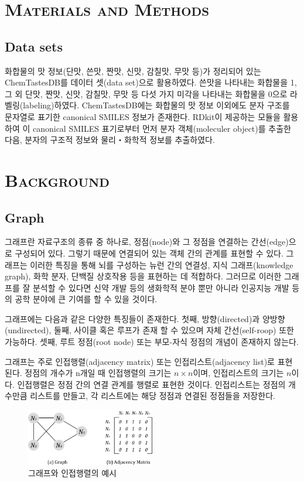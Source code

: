 \documentclass[9pt]{ieeeconf}
\begin{document}
\section[short]{\Large {\textsc{Materials and Methods}}}
\subsection[short]{\large {Data sets}}
화합물의 맛 정보(단맛, 쓴맛, 짠맛, 신맛, 감칠맛, 무맛 등)가 정리되어 있는 ChemTastesDB\cite{rojas2022chemtastesdb}를 데이터 셋(data set)으로 활용하였다. 쓴맛을 나타내는 화합물을 1, 그 외 단맛, 짠맛, 신맛, 감칠맛, 무맛 등 다섯 가지 미각을 나타내는 화합물을 0으로 라벨링(labeling)하였다.
ChemTastesDB에는 화합물의 맛 정보 이외에도 분자 구조를 문자열로 표기한 canonical SMILES 정보가 존재한다. RDkit이 제공하는 모듈을 활용하여 이 canonical SMILES 표기로부터 먼저 분자 객체(moleculer object)를 추출한 다음, 분자의 구조적 정보와 물리‧화학적 정보를 추출하였다.

\section[short]{\Large {\textsc{Background}}}
\subsection[short]{\large {Graph}}
\indent 그래프란 자료구조의 종류 중 하나로, 정점(node)와 그 정점을 연결하는 간선(edge)으로 구성되어 있다.
그렇기 때문에 연결되어 있는 객체 간의 관계를 표현할 수 있다. 그래프는 이러한 특징을 통해 뇌를 구성하는 뉴런 간의 연결성, 지식 그래프(knowledge graph), 화학 분자, 단백질 상호작용 등을 표현하는 데 적합하다.
그러므로 이러한 그래프를 잘 분석할 수 있다면 신약 개발 등의 생화학적 분야 뿐만 아니라 인공지능 개발 등의 공학 분야에 큰 기여를 할 수 있을 것이다.

\indent 그래프에는 다음과 같은 다양한 특징들이 존재한다. 첫째, 방향(directed)과 양방향(undirected), 둘째, 사이클 혹은 루프가 존재 할 수 있으며 자체 간선(self-roop) 또한 가능하다.
셋째, 루트 정점(root node) 또는 부모-자식 정점의 개념이 존재하지 않는다.

\indent 그래프는 주로 인접행렬(adjacency matrix) 또는 인접리스트(adjacency list)로 표현된다. 정점의 개수가 n개일 때 인접행렬의 크기는 $n \times n$이며, 인접리스트의 크기는 $n$이다. 인접행렬은 정점 간의 연결 관계를 행렬로 표현한 것이다. 인접리스트는 정점의 개수만큼 리스트를 만들고, 각 리스트에는 해당 정점과 연결된 정점들을 저장한다.
\begin{figure}[h]
    \centering
    \includegraphics[width=0.5\textwidth]{./images/adjacency_matrix.png}
    \caption{그래프와 인접행렬의 예시}
\end{figure}
\end{document}
